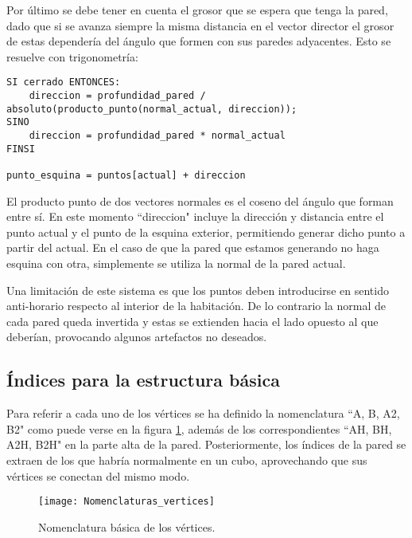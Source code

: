 Por último se debe tener en cuenta el grosor que se espera que tenga la pared, dado que si se avanza siempre la misma distancia en el vector director el grosor de estas dependería del ángulo que formen con sus paredes adyacentes. Esto se resuelve con trigonometría:

\begin{lstlisting}
SI cerrado ENTONCES:
    direccion = profundidad_pared / absoluto(producto_punto(normal_actual, direccion));
SINO
    direccion = profundidad_pared * normal_actual
FINSI

punto_esquina = puntos[actual] + direccion
\end{lstlisting}

El producto punto de dos vectores normales es el coseno del ángulo que forman entre sí. En este momento ``direccion" incluye la dirección y distancia entre el punto actual y el punto de la esquina exterior, permitiendo generar dicho punto a partir del actual. En el caso de que la pared que estamos generando no haga esquina con otra, simplemente se utiliza la normal de la pared actual.

Una limitación de este sistema es que los puntos deben introducirse en sentido anti-horario respecto al interior de la habitación. De lo contrario la normal de cada pared queda invertida y estas se extienden hacia el lado opuesto al que deberían, provocando algunos artefactos no deseados.

\subsection{Índices para la estructura básica}
Para referir a cada uno de los vértices se ha definido la nomenclatura ``A, B, A2, B2" como puede verse en la figura \ref{fig:nomenclatura_vertices}, además de los correspondientes ``AH, BH, A2H, B2H" en la parte alta de la pared. Posteriormente, los índices de la pared se extraen de los que habría normalmente en un cubo, aprovechando que sus vértices se conectan del mismo modo.

\begin{figure}[H]
    \centering
    \texttt{[image: Nomenclaturas\_vertices]}
    \caption{Nomenclatura básica de los vértices.}
    \label{fig:nomenclatura_vertices}
\end{figure}

